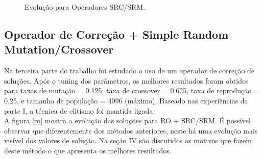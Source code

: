 \documentclass[conference]{IEEEtran}
\begin{document}
\begin{figure}[!t]
\centering
{}
\hfil
{}
\caption{Evolução para Operadores SRC/SRM.}
\label{sr}
\end{figure}

\newpage

\subsection{Operador de Correção + Simple Random Mutation/Crossover}

Na terceira parte do trabalho foi estudado o uso de um operador de correção de soluções. Após o tuning dos parâmetros, os melhores resultados foram obtidos para taxas de mutação = 0.125, taxa de crossover = 0.625, taxa de reprodução = 0.25, e tamanho de população = 4096 (máximo). Baseado nas experiências da parte I, a técnica de elitismo foi mantida ligada.\\

A figura \ref{ro} mostra a evolução das soluções para RO + SRC/SRM. É possível observar que diferentemente dos métodos anteriores, neste há uma evolução mais visível dos valores de solução. Na seção IV são discutidos os motivos que fazem deste método o que apresenta os melhores resultados.
\end{document}
